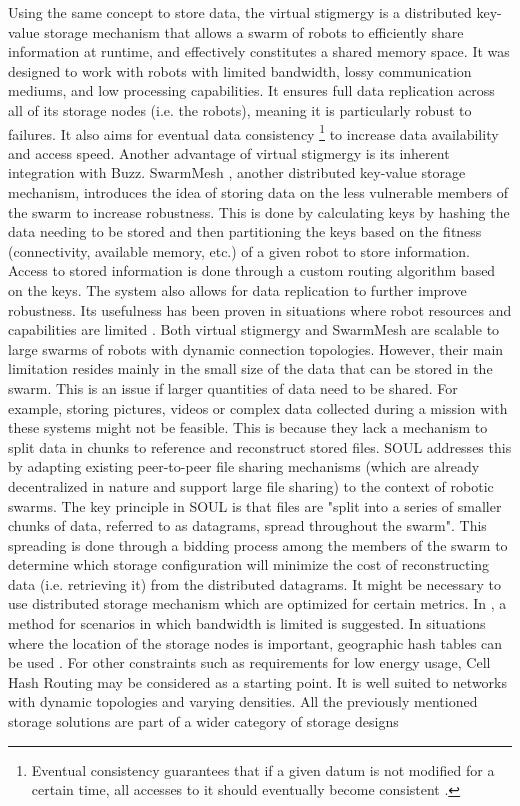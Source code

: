 Using the same concept to store data, the virtual stigmergy \cite{pinciroliTuple2016} is a distributed key-value storage mechanism that allows a swarm of robots to efficiently share information at runtime, and effectively constitutes a shared memory space. It was designed to work with robots with limited bandwidth, lossy communication mediums, and low processing capabilities. It ensures full data replication across all of its storage nodes (i.e. the robots), meaning it is particularly robust to failures. It also aims for eventual data consistency \footnote{Eventual consistency guarantees that if a given datum is not modified for a certain time, all accesses to it should eventually become consistent \cite{vogels2009eventually}.} to increase data availability and access speed. Another advantage of virtual stigmergy is its inherent integration with Buzz. SwarmMesh \cite{majcherczykSwarmmesh2020}, another distributed key-value storage mechanism, introduces the idea of storing data on the less vulnerable members of the swarm to increase robustness. This is done by calculating keys by hashing the data needing to be stored and then partitioning the keys based on the fitness (connectivity, available memory, etc.) of a given robot to store information. Access to stored information is done through a custom routing algorithm based on the keys. The system also allows for data replication to further improve robustness. Its usefulness has been proven in situations where robot resources and capabilities are limited \cite{majcherczyk2021distributed}. Both virtual stigmergy and SwarmMesh are scalable to large swarms of robots with dynamic connection topologies. However, their main limitation resides mainly in the small size of the data that can be stored in the swarm. This is an issue if larger quantities of data need to be shared. For example, storing pictures, videos or complex data collected during a mission with these systems might not be feasible. This is because they lack a mechanism to split data in chunks to reference and reconstruct stored files. SOUL \cite{varadharajan2020soul} addresses this by adapting existing peer-to-peer file sharing mechanisms (which are already decentralized in nature and support large file sharing) to the context of robotic swarms. The key principle in SOUL is that files are "split into a series of smaller chunks of data, referred to as datagrams, spread throughout the swarm". This spreading is done through a bidding process among the members of the swarm to determine which storage configuration will minimize the cost of reconstructing data (i.e. retrieving it) from the distributed datagrams. It might be necessary to use distributed storage mechanism which are optimized for certain metrics. In \cite{amigoni2017multirobot}, a method for scenarios in which bandwidth is limited is suggested. In situations where the location of the storage nodes is important, geographic hash tables can be used \cite{wu2008ldht,ratnasamy2002ght,ahullo2008supporting}. For other constraints such as requirements for low energy usage, Cell Hash Routing  \cite{araujo2005chr} may be considered as a starting point. It is well suited to networks with dynamic topologies and varying densities. All the previously mentioned storage solutions are part of a wider category of storage designs 